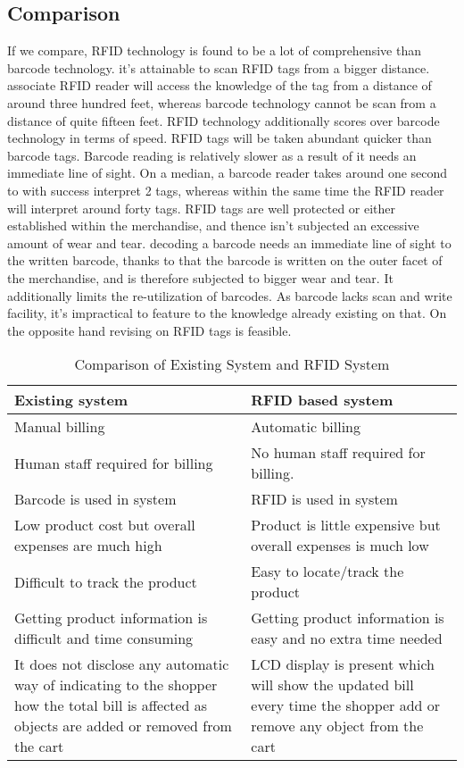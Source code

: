 \documentclass[12pt]{article}
\begin{document}
\subsection{Comparison}
\hspace*{1cm}If we compare, RFID technology is found to be a lot of comprehensive than barcode technology. it's attainable to scan RFID tags from a bigger distance. associate RFID reader will access the knowledge of the tag from a distance of around three hundred feet, whereas barcode technology cannot be scan from a distance of quite fifteen feet. RFID technology additionally scores over barcode technology in terms of speed. RFID tags will be taken abundant quicker than barcode tags. Barcode reading is relatively slower as a result of it needs an immediate line of sight. On a median, a barcode reader takes around one second to with success interpret 2 tags, whereas within the same time the RFID reader will interpret around forty tags. RFID tags are well protected or either established within the merchandise, and thence isn't subjected an excessive amount of wear and tear. decoding a barcode needs an immediate line of sight to the written barcode, thanks to that the barcode is written on the outer facet of the merchandise, and is therefore subjected to bigger wear and tear. It additionally limits the re-utilization of barcodes. As barcode lacks scan and write facility, it's impractical to feature to the knowledge already existing on that. On the opposite hand revising on RFID tags is feasible.
\begin{table}
\centering
\begin{tabular}{ |p{8cm}||p{8cm}| }
\hline
\textbf{Existing system} & \textbf{RFID based system} \\ 
\hline\hline
Manual billing & Automatic billing\\
\hline
Human staff required for billing & No human staff required for billing.\\
\hline
Barcode is used in system & RFID is used in system\\
\hline
Low product cost but overall expenses are much high & Product is little expensive but overall expenses is much low\\
\hline
Difficult to track the product & Easy to locate/track the product\\
\hline
Getting product information is difficult and time consuming & Getting product information is easy and no extra time needed\\
\hline
It does not disclose any automatic way of indicating to the shopper how the total bill is affected as objects are added or removed from the cart & LCD display is present which will show the updated bill every time the shopper add or remove any object from the cart\\
\hline
\end{tabular}
\caption{Comparison of Existing System and RFID System}
\end{table}
\end{document}
